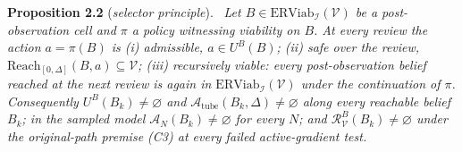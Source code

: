 \documentclass[11pt,a4paper]{article}
\theoremstyle{plain}
\theoremstyle{definition}
\theoremstyle{remark}
\newenvironment{restated}[2]{\par\medskip\noindent\textbf{#1} (\textit{#2}).\ \itshape}{\par\medskip}
\newcommand{\ERViab}{\mathrm{ERViab}}
\newcommand{\cV}{\mathcal{V}}
\newcommand{\cI}{\mathcal{I}}
\newcommand{\cR}{\mathcal{R}}
\newcommand{\cA}{\mathcal{A}}
\newcommand{\Atube}{\cA_{\mathrm{tube}}}
\newcommand{\Reach}{\mathrm{Reach}}
\newcommand{\hyp}[1]{\textup{(#1)}}
\begin{document}
\begin{restated}{Proposition 2.2}{selector principle}
Let $B\in\ERViab_\cI(\cV)$ be a post-observation cell and $\pi$ a policy witnessing viability on $B$. At every review the action $a=\pi(B)$ is (i) admissible, $a\in U^B(B)$; (ii) safe over the review, $\Reach_{[0,\Delta]}(B,a)\subseteq\cV$; (iii) recursively viable: every post-observation belief reached at the next review is again in $\ERViab_\cI(\cV)$ under the continuation of $\pi$. Consequently $U^B(B_k)\neq\varnothing$ and $\Atube(B_k,\Delta)\neq\varnothing$ along every reachable belief $B_k$; in the sampled model $\cA_N(B_k)\neq\varnothing$ for every $N$; and $\cR^B_\cV(B_k)\neq\varnothing$ under the original-path premise \hyp{C3} at every failed active-gradient test.
\end{restated}
\end{document}

